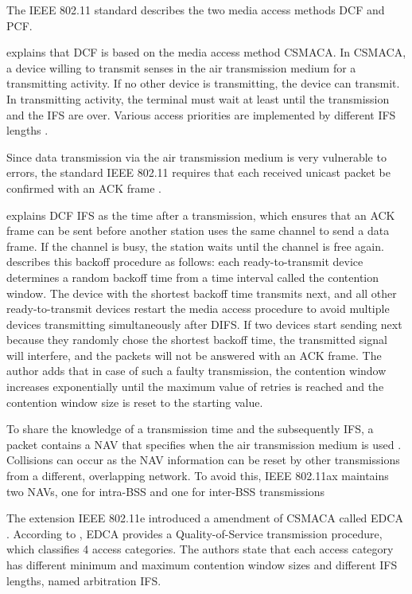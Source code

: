 The IEEE 802.11 standard describes the two media access methods \ac{DCF} and \ac{PCF}.

\textcite[283]{sauter_wireless_2022} explains that \ac{DCF} is based on the media access method \ac{CSMACA}.
In \ac{CSMACA}, a device willing to transmit senses in the air transmission medium for a transmitting activity.
If no other device is transmitting, the device can transmit.
In transmitting activity, the terminal must wait at least until the transmission and the \ac{IFS} are over.
Various access priorities are implemented by different \ac{IFS} lengths \cite[120]{sommer_vehicular_2014}.

Since data transmission via the air transmission medium is very vulnerable to errors,
the standard IEEE 802.11 requires that each received unicast packet be confirmed with an \ac{ACK} frame \cite[120]{sommer_vehicular_2014}.

\textcite[284]{sauter_wireless_2022} explains \ac{DCF} \ac{IFS} as the time after a transmission, which ensures that an \ac{ACK} frame can be sent before another station uses the same channel to send a data frame.
If the channel is busy, the station waits until the channel is free again.
\textcite[284-285]{sauter_wireless_2022} describes this backoff procedure as follows: each ready-to-transmit device determines
a random backoff time from a time interval called the contention window.
The device with the shortest backoff time transmits next, and all other ready-to-transmit devices restart the media access procedure to avoid multiple devices transmitting simultaneously after \ac{DIFS}.
If two devices start sending next because they randomly chose the shortest backoff time,
the transmitted signal will interfere, and the packets will not be answered with an \ac{ACK} frame.
The author adds that in case of such a faulty transmission, the contention window increases exponentially until the maximum value of retries is reached and
the contention window size is reset to the starting value.

To share the knowledge of a transmission time and the subsequently \ac{IFS}, a packet contains a \ac{NAV} that
specifies when the air transmission medium is used \cite[284]{sauter_wireless_2022}.
Collisions can occur as the \ac{NAV} information can be reset by other transmissions from a different, overlapping network.
To avoid this, IEEE 802.11ax maintains two \ac{NAV}s, one for intra-\ac{BSS} and one for inter-\ac{BSS} transmissions \cite{ieee_standard_2021ax}

The extension IEEE 802.11e introduced a amendment of \ac{CSMACA} called \ac{EDCA} \cite[121]{sommer_vehicular_2014} \cite{wu_ieee_2006}.
According to \textcite[121]{sommer_vehicular_2014}, \ac{EDCA} provides a Quality-of-Service transmission procedure,
which classifies \num{4} access categories.
The authors state that each access category has different minimum and maximum contention window sizes and different \ac{IFS} lengths, named
arbitration \ac{IFS}.

